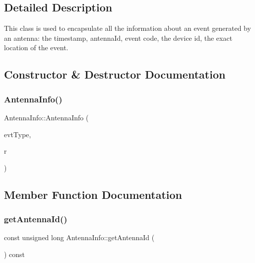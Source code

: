 \subsection{Detailed Description}
This class is used to encapsulate all the information about an event generated by an antenna\+: the timestamp, antenna\+Id, event code, the device id, the exact location of the event. 

\subsection{Constructor \& Destructor Documentation}
\mbox{\label{class_antenna_info_a4cbcbed39618d71c76ab72b777b4d849}} 
\subsubsection{\texorpdfstring{Antenna\+Info()}{AntennaInfo()}}
{\footnotesize\ttfamily Antenna\+Info\+::\+Antenna\+Info (\begin{DoxyParamCaption}\item[{\hyperlink{_event_type_8h_a2628ea8d12e8b2563c32f05dc7fff6fa}{Event\+Type}}]{evt\+Type,  }\item[{\hyperlink{class_row}{Row}}]{r }\end{DoxyParamCaption})}



\subsection{Member Function Documentation}
\mbox{\label{class_antenna_info_a551235c9dca1231beedda388a36280a5}} 
\subsubsection{\texorpdfstring{get\+Antenna\+Id()}{getAntennaId()}}
{\footnotesize\ttfamily const unsigned long Antenna\+Info\+::get\+Antenna\+Id (\begin{DoxyParamCaption}{ }\end{DoxyParamCaption}) const}

